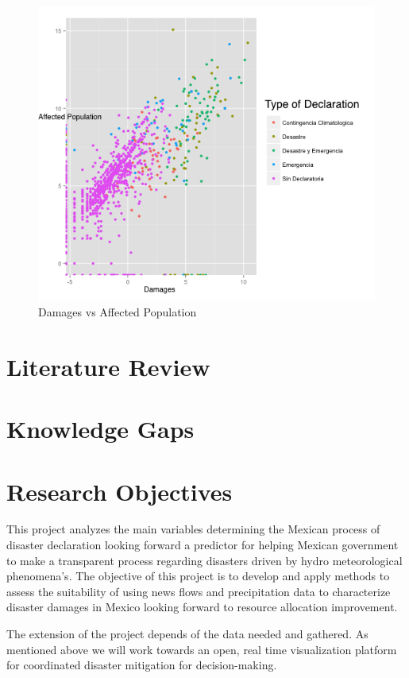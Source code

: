 \documentclass[]{article}
\begin{document}
\begin{figure}[htbp]
\centering
\includegraphics{img/shady.png}
\caption{Damages vs Affected Population}
\end{figure}

\section{Literature Review}\label{literature-review}

\section{Knowledge Gaps}\label{knowledge-gaps}

\section{Research Objectives}\label{research-objectives}

This project analyzes the main variables determining the Mexican process
of disaster declaration looking forward a predictor for helping Mexican
government to make a transparent process regarding disasters driven by
hydro meteorological phenomena's. The objective of this project is to
develop and apply methods to assess the suitability of using news flows
and precipitation data to characterize disaster damages in Mexico
looking forward to resource allocation improvement.

The extension of the project depends of the data needed and gathered. As
mentioned above we will work towards an open, real time visualization
platform for coordinated disaster mitigation for decision-making.
\end{document}
